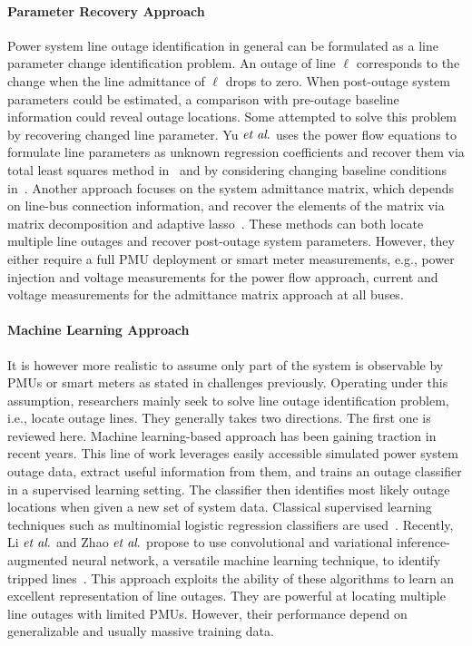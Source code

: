 \paragraph{Parameter Recovery Approach}
Power system line outage identification in general can be formulated as a line parameter change identification problem. An outage of line $\ell$ corresponds to the change when the line admittance of $\ell$ drops to zero. When post-outage system parameters could be estimated, a comparison with pre-outage baseline information could reveal outage locations. Some attempted to solve this problem by recovering changed line parameter. Yu $\textit{et al}.$ uses the power flow equations to formulate line parameters as unknown regression coefficients and recover them via total least squares method in~\cite{Yu2018} and by considering changing baseline conditions in~\cite{Yu2019}. Another approach focuses on the system admittance matrix, which depends on line-bus connection information, and recover the elements of the matrix via matrix decomposition and adaptive lasso~\cite{Babakmehr2016,Ardakanian2019a}. These methods can both locate multiple line outages and recover post-outage system parameters. However, they either require a full PMU deployment or smart meter measurements, e.g., power injection and voltage measurements for the power flow approach, current and voltage measurements for the admittance matrix approach at all buses. 

\paragraph{Machine Learning Approach}
It is however more realistic to assume only part of the system is observable by PMUs or smart meters as stated in challenges previously. Operating under this assumption, researchers mainly seek to solve line outage identification problem, i.e., locate outage lines. They generally takes two directions. The first one is reviewed here. Machine learning-based approach has been gaining traction in recent years. This line of work leverages easily accessible simulated power system outage data, extract useful information from them, and trains an outage classifier in a supervised learning setting. The classifier then identifies most likely outage locations when given a new set of system data. Classical supervised learning techniques such as multinomial logistic regression classifiers are used~\cite{Garcia2016,Kim2018}. Recently, Li $\textit{et al}.$ and Zhao $\textit{et al}.$ propose to use convolutional and variational inference-augmented neural network, a versatile machine learning technique, to identify tripped lines~\cite{Li2019a,Zhao2020}. This approach exploits the ability of these algorithms to learn an excellent representation of line outages. They are powerful at locating multiple line outages with limited PMUs. However, their performance depend on generalizable and usually massive training data. 


